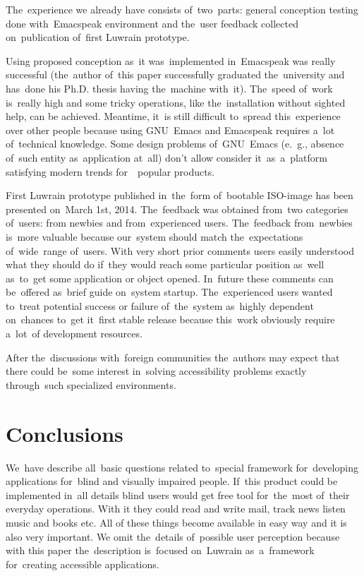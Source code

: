 \documentclass{acm_proc_article-sp}
\begin{document}
The~experience we already have consists of~two~parts: 
general conception testing done with~Emacspeak environment 
and the~user feedback collected on~publication of~first Luwrain prototype.

Using proposed conception as~it was~implemented in~Emacspeak was really successful 
(the~author of~this paper successfully graduated the~university and has~done his Ph.D. thesis having the~machine with~it).
The~speed of~work is~really high and some tricky operations,
like the~installation without sighted help, 
can be achieved.
Meantime, it~is still difficult to~spread this~experience over other people 
because using GNU~Emacs and Emacspeak requires a~lot of~technical knowledge.
Some design problems of~GNU~Emacs (e.~g., absence of~such entity as~application at~all)
don't allow consider it~as~a~platform satisfying modern trends for~~popular products.

First Luwrain prototype published in~the~form of~bootable ISO-image 
has been presented on~March 1st, 2014.
The~feedback was obtained from~two categories of~users: from newbies and from~experienced users.
The~feedback from~newbies is~more valuable because our~system should
match the~expectations of~wide~range of~users.
With very short prior comments users easily understood what they should do if~they would reach some particular position 
as~well as~to~get some application or object opened.
In~future these comments can be~offered as~brief guide on~system startup.
The~experienced users wanted to~treat potential success or failure of~the~system 
as~highly dependent on~chances to~get it~first stable release
because this~work obviously require a~lot~of development resources.

After the~discussions with~foreign communities 
the~authors may expect that there could be~some interest 
in~solving accessibility problems exactly through~such specialized environments.

\section{Conclusions}

We~have describe all~basic questions related 
to~special framework for~developing applications for~blind and visually impaired people.
If~this product could be implemented in~all details
blind users would get free tool for~the~most of~their everyday operations.
With it they could read and write mail, track news 
listen music and books etc.
All of these things become available  in easy way 
and  it is also very important.
We omit the~details of~possible user perception 
because with this paper the~description is~focused on~Luwrain as~a~framework for~creating accessible applications.
\end{document}
